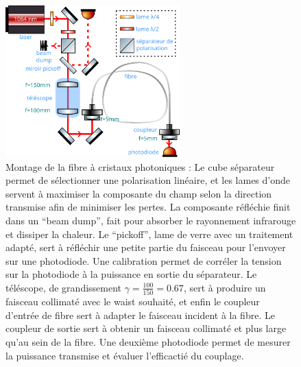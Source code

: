 \documentclass[11pt,a4paper]{article}
\begin{document}
\begin{figure}[h]
	\centering
	\includegraphics[width=0.6\textwidth]{./img/schema couplage.pdf}
	\caption[Montage de la fibre à cristaux photoniques]{Montage de la fibre à cristaux photoniques :
	\small Le cube séparateur permet de sélectionner une polarisation linéaire, et les lames d'onde servent à maximiser la composante du champ selon la direction transmise afin de minimiser les pertes. La composante réfléchie finit dans un ``beam dump'', fait pour absorber le rayonnement infrarouge et dissiper la chaleur. Le ``pickoff'', lame de verre avec un traitement adapté, sert à réfléchir une petite partie du faisceau pour l'envoyer sur une photodiode. Une calibration permet de corréler la tension sur la photodiode à la puissance en sortie du séparateur. Le téléscope, de grandissement $\gamma = \frac{100}{150} = 0.67$, sert à produire un faisceau collimaté avec le waist souhaité, et enfin le coupleur d'entrée de fibre sert à adapter le faisceau incident à la fibre. Le coupleur de sortie sert à obtenir un faisceau collimaté et plus large qu'au sein de la fibre. Une deuxième photodiode permet de mesurer la puissance transmise et évaluer l'efficactié du couplage.}
	\label{fig:couplage}
\end{figure}
\end{document}
